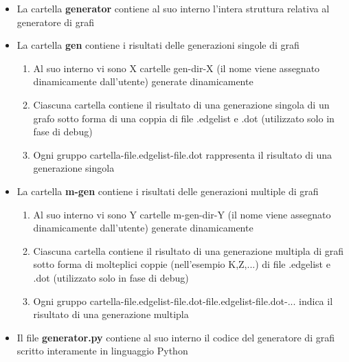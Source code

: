 \begin{itemize}
	\item La cartella \textbf{generator} contiene al suo interno l'intera struttura relativa al generatore di grafi
	\item La cartella \textbf{gen} contiene i risultati delle generazioni singole di grafi
	\begin{enumerate}
		\item Al suo interno vi sono X cartelle gen-dir-X (il nome viene assegnato dinamicamente dall'utente) generate dinamicamente
		\item Ciascuna cartella contiene il risultato di una generazione singola di un grafo sotto forma di una coppia di file .edgelist e .dot (utilizzato solo in fase di debug)
		\item Ogni gruppo cartella-file.edgelist-file.dot rappresenta il risultato di una generazione singola
	\end{enumerate}
	\item La cartella \textbf{m-gen} contiene i risultati delle generazioni multiple di grafi
	\begin{enumerate}
		\item Al suo interno vi sono Y cartelle m-gen-dir-Y (il nome viene assegnato dinamicamente dall'utente) generate dinamicamente
		\item Ciascuna cartella contiene il risultato di una generazione multipla di grafi sotto forma di molteplici coppie (nell'esempio K,Z,...) di file .edgelist e .dot (utilizzato solo in fase di debug)
		\item Ogni gruppo cartella-file.edgelist-file.dot-file.edgelist-file.dot-... indica il risultato di una generazione multipla
	\end{enumerate}
	\item Il file \textbf{generator.py} contiene al suo interno il codice del generatore di grafi scritto interamente in linguaggio Python
\end{itemize}

